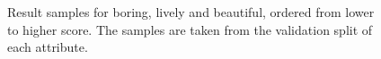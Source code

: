 \begin{figure}[ht]
	\centering
	\hspace{0mm}
	\hspace{0mm}
	\caption[Result samples]{
		Result samples for boring, lively and beautiful, ordered from lower to higher score.
		The samples are taken from the validation split of each attribute.
		}
\end{figure}
\label{fig:samples_2}
